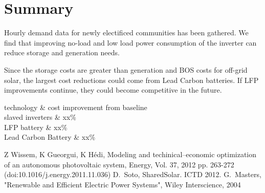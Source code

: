 \documentclass[conference]{IEEEtran}
\begin{document}
\section{Summary}
Hourly demand data for newly electificed communities has been gathered.
We find that improving no-load and low load power consumption of the
inverter can reduce storage and generation needs.

Since the storage costs are greater than generation and BOS costs
for off-grid solar, the largest cost reductions could come from
Lead Carbon batteries.
If LFP improvements continue, they could become competitive in the
future.



technology \& cost improvement from baseline \\
slaved inverters    \& xx\% \\
LFP battery         \& xx\% \\
Lead Carbon Battery \& xx\% \\


\begin{thebibliography}{1}
Z Wissem, K Gueorgui, K H\'edi,
Modeling and techinical--economic optimization of an autonomous
photovoltaic system,
Energy, Vol. 37, 2012 pp. 263-272
(doi:10.1016/j.energy.2011.11.036)
D.~Soto, SharedSolar. ICTD 2012.
G.~Masters,
"Renewable and Efficient Electric Power Systems",
Wiley Interscience,
2004
\end{thebibliography}
\end{document}
